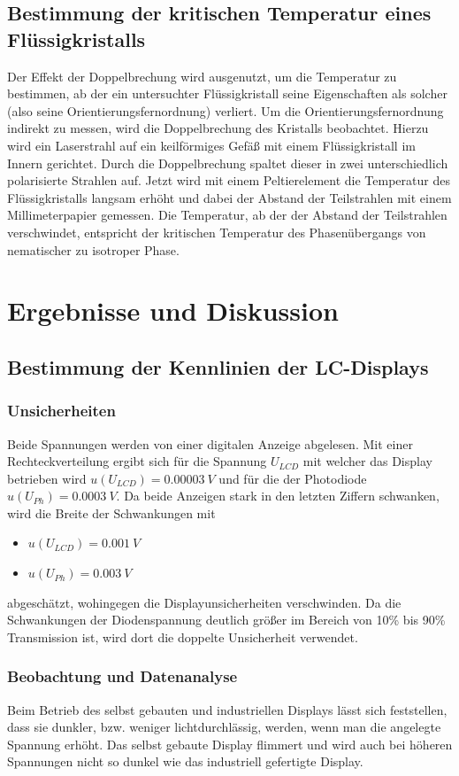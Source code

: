 \documentclass[
	a4paper,
	12pt,
	pagesize,
	ngerman
]{scrartcl}
\begin{document}
	\subsection{Bestimmung der kritischen Temperatur eines Flüssigkristalls}
	Der Effekt der Doppelbrechung wird ausgenutzt, um die Temperatur zu bestimmen, ab der ein untersuchter Flüssigkristall seine Eigenschaften als solcher (also seine Orientierungsfernordnung) verliert.
	Um die Orientierungsfernordnung indirekt zu messen, wird die Doppelbrechung des Kristalls beobachtet.
	Hierzu wird ein Laserstrahl auf ein keilförmiges Gefäß mit einem Flüssigkristall im Innern gerichtet.
	Durch die Doppelbrechung spaltet dieser in zwei unterschiedlich polarisierte Strahlen auf.
	Jetzt wird mit einem Peltierelement die Temperatur des Flüssigkristalls langsam erhöht und dabei der Abstand der Teilstrahlen mit einem Millimeterpapier gemessen.
	Die Temperatur, ab der der Abstand der Teilstrahlen verschwindet, entspricht der kritischen Temperatur des Phasenübergangs von nematischer zu isotroper Phase.

	\section{Ergebnisse und Diskussion}
	\subsection{Bestimmung der Kennlinien der LC-Displays}
	\subsubsection{Unsicherheiten}
	Beide Spannungen werden von einer digitalen Anzeige abgelesen.
	Mit einer Rechteckverteilung ergibt sich für die Spannung $U_{LCD}$ mit welcher das Display betrieben wird $u(U_{LCD})=\SI{0.00003}{V}$ und für die der Photodiode $u(U_{Ph})=\SI{0.0003}{V}$.
	Da beide Anzeigen stark in den letzten Ziffern schwanken, wird die Breite der Schwankungen mit
	\begin{itemize}
		\item $u(U_{LCD})=\SI{0.001}{V}$
		\item $u(U_{Ph})=\SI{0.003}{V}$
	\end{itemize}
	abgeschätzt, wohingegen die Displayunsicherheiten verschwinden.
	Da die Schwankungen der Diodenspannung deutlich größer im Bereich von 10\% bis 90\% Transmission ist, wird dort die doppelte Unsicherheit verwendet.
	\subsubsection{Beobachtung und Datenanalyse}
	Beim Betrieb des selbst gebauten und industriellen Displays lässt sich feststellen, dass sie dunkler, bzw. weniger lichtdurchlässig, werden, wenn man die angelegte Spannung erhöht.
	Das selbst gebaute Display flimmert und wird auch bei höheren Spannungen nicht so dunkel wie das industriell gefertigte Display.
\end{document}
